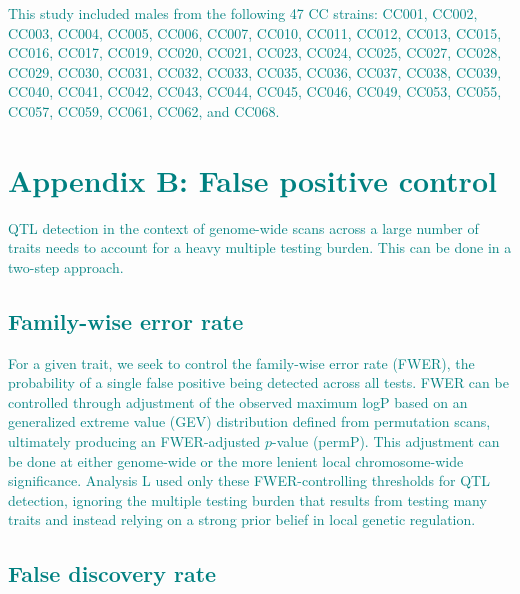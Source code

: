 \documentclass[9pt,twocolumn,twoside]{gsajnl}
\newcommand{\WV}[2]{\textcolor{red}{#1\footnote{\textcolor{red}{WV: #2}}}}
\newcommand{\GKinline}[1]{\textcolor{teal}{#1}}
\begin{document}
\GKinline{This study included males from the following 47 CC strains: CC001, CC002, CC003, CC004, CC005, CC006, CC007, CC010, CC011, CC012, CC013, CC015, CC016, CC017, CC019, CC020, CC021, CC023, CC024, CC025, CC027, CC028, CC029, CC030, CC031, CC032, CC033, CC035, CC036, CC037, CC038, CC039, CC040, CC041, CC042, CC043, CC044, CC045, CC046, CC049, CC053, CC055, CC057, CC059, CC061, CC062, and CC068.}

\section{\GKinline{Appendix B: False positive control}}


\GKinline{QTL detection in the context of genome-wide scans across a large number of traits needs to account for a heavy multiple testing burden. This can be done in a two-step approach.}

\subsection{\GKinline{Family-wise error rate}}

\GKinline{For a given trait, we seek to control the family-wise error rate (FWER), the probability of a single false positive being detected across all tests. FWER can be controlled through adjustment of the observed maximum logP based on an generalized extreme value (GEV) distribution defined from permutation scans, ultimately producing an FWER-adjusted $p$-value (permP). This adjustment can be done at either genome-wide or the more lenient local chromosome-wide significance. Analysis L used only these FWER-controlling thresholds for QTL detection, ignoring the multiple testing burden that results from testing many traits and instead relying on a strong prior belief in local genetic regulation.}

\subsection{\GKinline{False discovery rate}}

\end{document}
